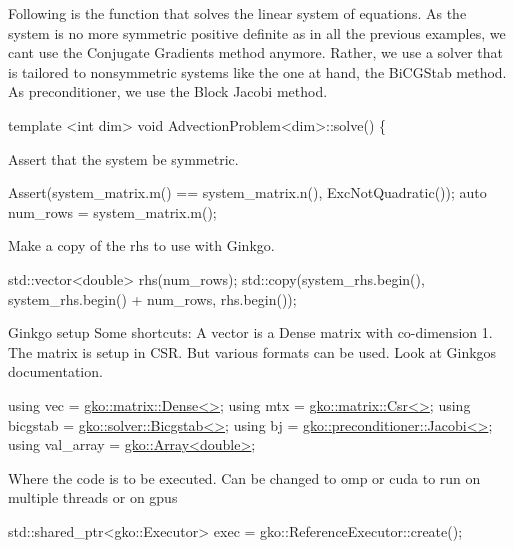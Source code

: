 Following is the function that solves the linear system of equations. As the system is no more symmetric positive definite as in all the previous examples, we can\textquotesingle{}t use the Conjugate Gradients method anymore. Rather, we use a solver that is tailored to nonsymmetric systems like the one at hand, the Bi\+C\+G\+Stab method. As preconditioner, we use the Block Jacobi method.


\begin{DoxyCode}
\textcolor{keyword}{template} <\textcolor{keywordtype}{int} dim>
\textcolor{keywordtype}{void} AdvectionProblem<dim>::solve()
\{
\end{DoxyCode}


Assert that the system be symmetric.


\begin{DoxyCode}
Assert(system\_matrix.m() == system\_matrix.n(), ExcNotQuadratic());
\textcolor{keyword}{auto} num\_rows = system\_matrix.m();
\end{DoxyCode}


Make a copy of the rhs to use with Ginkgo.


\begin{DoxyCode}
std::vector<double> rhs(num\_rows);
std::copy(system\_rhs.begin(), system\_rhs.begin() + num\_rows, rhs.begin());
\end{DoxyCode}


Ginkgo setup Some shortcuts\+: A vector is a Dense matrix with co-\/dimension 1. The matrix is setup in C\+SR. But various formats can be used. Look at Ginkgo\textquotesingle{}s documentation.


\begin{DoxyCode}
\textcolor{keyword}{using} vec = \hyperlink{classgko_1_1matrix_1_1Dense}{gko::matrix::Dense<>};
\textcolor{keyword}{using} mtx = \hyperlink{classgko_1_1matrix_1_1Csr}{gko::matrix::Csr<>};
\textcolor{keyword}{using} bicgstab = \hyperlink{classgko_1_1solver_1_1Bicgstab}{gko::solver::Bicgstab<>};
\textcolor{keyword}{using} bj = \hyperlink{classgko_1_1preconditioner_1_1Jacobi}{gko::preconditioner::Jacobi<>};
\textcolor{keyword}{using} val\_array = \hyperlink{classgko_1_1Array}{gko::Array<double>};
\end{DoxyCode}


Where the code is to be executed. Can be changed to {\ttfamily omp} or {\ttfamily cuda} to run on multiple threads or on gpu\textquotesingle{}s


\begin{DoxyCode}
std::shared\_ptr<gko::Executor> exec = gko::ReferenceExecutor::create();
\end{DoxyCode}


